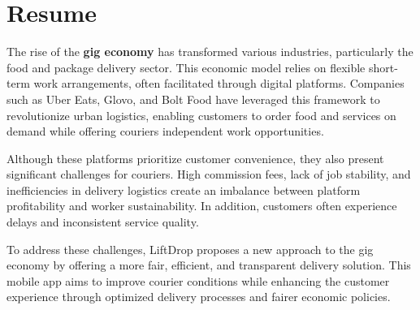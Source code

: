 \section {Resume} 

The rise of the \textbf{gig economy} has transformed various industries, particularly the food and package delivery sector. This economic model relies on flexible short-term work arrangements, often facilitated through digital platforms. Companies such as Uber Eats, Glovo, and Bolt Food have leveraged this framework to revolutionize urban logistics, enabling customers to order food and services on demand while offering couriers independent work opportunities.

\vspace{5mm}

Although these platforms prioritize customer convenience, they also present significant challenges for couriers. High commission fees, lack of job stability, and inefficiencies in delivery logistics create an imbalance between platform profitability and worker sustainability. In addition, customers often experience delays and inconsistent service quality.

\vspace{5mm}

To address these challenges, LiftDrop proposes a new approach to the gig economy by offering a more fair, efficient, and transparent delivery solution. This mobile app aims to improve courier conditions while enhancing the customer experience through optimized delivery processes and fairer economic policies.